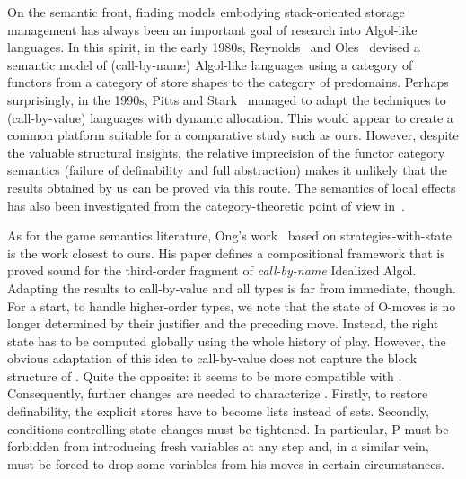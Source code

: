 \documentclass{CSML}
\theoremstyle{definition}\newtheorem{definition}[thm]{Definition}
\theoremstyle{definition}\newtheorem{example}[thm]{Example}
\theoremstyle{definition}\newtheorem{proposition}[thm]{Proposition}
\theoremstyle{definition}\newtheorem{lemma}[thm]{Lemma}
\theoremstyle{definition}\newtheorem{theorem}[thm]{Theorem}
\theoremstyle{definition}\newtheorem{corollary}[thm]{Corollary}
\theoremstyle{definition}\newtheorem{remark}[thm]{Remark}
\newcommand\nt[1]{#1}
\begin{document}
On the semantic front, finding models embodying stack-oriented storage management
has always been an important goal of research into Algol-like languages.
In this spirit, in the early 1980s, Reynolds~\cite{Rey81} and Oles~\cite{Ole85} devised a semantic
model of \nt{(call-by-name)} Algol-like languages using a category of functors from a category of store shapes
to the category of predomains. Perhaps surprisingly, in the 1990s, Pitts and Stark~\cite{PS93,Sta95}
managed to adapt the techniques to \nt{(call-by-value)} languages with dynamic allocation.
This would appear to create a common platform suitable for a comparative study
such as ours.  However, despite the valuable structural insights, the relative
imprecision of the functor category semantics (failure of definability and full abstraction)
makes it unlikely that the results obtained by us can be proved via this route.
The semantics of local effects has also been investigated from the category-theoretic
point of view in~\cite{Pow06}.


As for the game semantics literature, Ong's work~\cite{Ong02} based on strategies-with-state
is the work closest to ours. His paper defines a compositional framework that is proved sound
for the third-order fragment of \emph{call-by-name} Idealized Algol. Adapting the results to call-by-value
and all types is far from immediate, though. For a start, to handle higher-order types, we note that
the state of O-moves is no longer determined by their justifier and the preceding move.
Instead, the right state has to be computed globally using the whole history
of play. However, the obvious adaptation of this idea to call-by-value does not capture
the block structure of . Quite the opposite: it seems to be more compatible with .
Consequently,  further changes are needed to characterize . Firstly,
to restore definability, the explicit stores have to become lists instead of sets.
Secondly, conditions controlling state changes must be tightened. In particular,
P must be forbidden from introducing fresh variables at any step and,  in a similar vein,
must be forced to drop some variables from his moves in certain circumstances.
\end{document}
